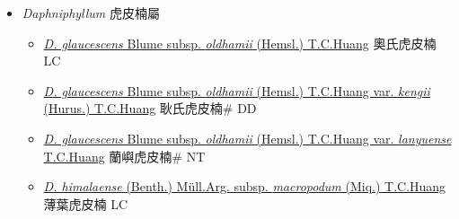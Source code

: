 
  \begin{itemize}
 \item[] \textit{Daphniphyllum} 虎皮楠屬
                    
  \begin{itemize}
        \item[] \href{http://www.theplantlist.org/tpl1.1/search?q=Daphniphyllum+glaucescens+subsp.+oldhamii}{\textit{D. glaucescens} Blume subsp. \textit{oldhamii} (Hemsl.) T.C.Huang}   奧氏虎皮楠 LC
        \item[] \href{http://www.theplantlist.org/tpl1.1/search?q=Daphniphyllum+glaucescens+subsp.+oldhamii+var.+kengii}{\textit{D. glaucescens} Blume subsp. \textit{oldhamii} (Hemsl.) T.C.Huang var. \textit{kengii} (Hurus.) T.C.Huang}   耿氏虎皮楠\# DD
        \item[] \href{http://www.theplantlist.org/tpl1.1/search?q=Daphniphyllum+glaucescens+subsp.+oldhamii+var.+lanyuense}{\textit{D. glaucescens} Blume subsp. \textit{oldhamii} (Hemsl.) T.C.Huang var. \textit{lanyuense} T.C.Huang}   蘭嶼虎皮楠\# NT
        \item[] \href{http://www.theplantlist.org/tpl1.1/search?q=Daphniphyllum+himalaense+subsp.+macropodum}{\textit{D. himalaense} (Benth.) Müll.Arg. subsp. \textit{macropodum} (Miq.) T.C.Huang}   薄葉虎皮楠 LC
  \end{itemize}
  \end{itemize}
